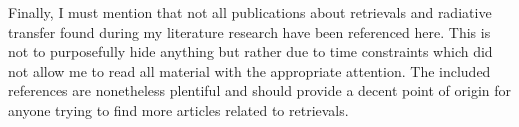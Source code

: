 Finally, I must mention that not all publications about retrievals and
radiative transfer found during my literature research have been referenced
here. This is not to purposefully hide anything but rather due to time
constraints which did not allow me to read all material with the appropriate
attention. The included references are nonetheless plentiful and should provide
a decent point of origin for anyone trying to find more articles related to
retrievals.

